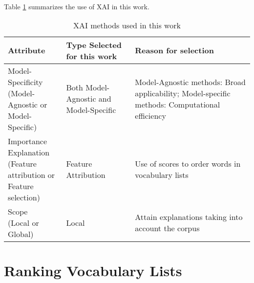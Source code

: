 Table \ref{table:XAi-method-criteria} summarizes the use of XAI in this work.

\begin{table}[ht]
	\centering
	\begin{tabularx}{\textwidth}{|X|X|X|}
		\hline
		\textbf{Attribute} & \textbf{Type Selected for this work} & \textbf{Reason for selection} \\
		\hline
		\makecell[l]{Model-Specificity                                                            \\(Model-Agnostic or \\Model-Specific)} & Both Model-Agnostic and Model-Specific & Model-Agnostic methods: Broad applicability; Model-specific methods: Computational efficiency \\
		\hline
		\makecell[l]{Importance Explanation                                                       \\(Feature attribution or \\Feature selection)}                                 & Feature Attribution                 & Use of scores to order words in vocabulary lists                                                                        \\
		\hline
		\makecell[l]{Scope                                                                        \\(Local or Global)}                                                       & Local                                  & Attain explanations taking into account the corpus                                          \\
		\hline
	\end{tabularx}
	\caption{XAI methods used in this work}
	\label{table:XAi-method-criteria}
\end{table}

\section{Ranking Vocabulary Lists} \label{sec:ranking-lists-of-vocabulary}


